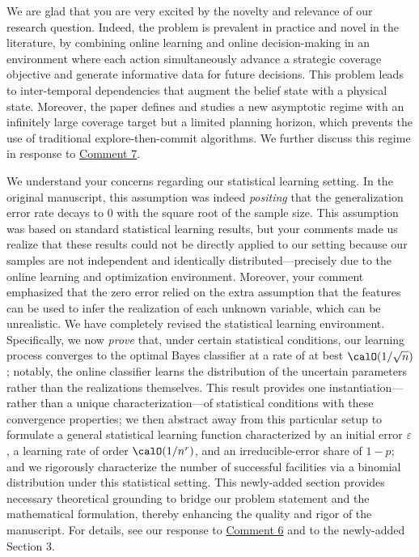 \documentclass[11pt]{article}
\begin{document}
We are glad that you are very excited by the novelty and relevance of our research question. Indeed, the problem is prevalent in practice and novel in the literature, by combining online learning and online decision-making in an environment where each action simultaneously advance a strategic coverage objective and generate informative data for future decisions. This problem leads to inter-temporal dependencies that augment the belief state with a physical state. Moreover, the paper defines and studies a new asymptotic regime with an infinitely large coverage target but a limited planning horizon, which prevents the use of traditional explore-then-commit algorithms. We further discuss this regime in response to \hyperref[R1:7]{\color{blue}Comment 7}.

We understand your concerns regarding our statistical learning setting. In the original manuscript, this assumption was indeed \textit{positing} that the generalization error rate decays to 0 with the square root of the sample size. This assumption was based on standard statistical learning results, but your comments made us realize that these results could not be directly applied to our setting because our samples are not independent and identically distributed---precisely due to the online learning and optimization environment. Moreover, your comment emphasized that the zero error relied on the extra assumption that the features can be used to infer the realization of each unknown variable, which can be unrealistic. We have completely revised the statistical learning environment. Specifically, we now \textit{prove} that, under certain statistical conditions, our learning process converges to the optimal Bayes classifier at a rate of at best $\calO(1/\sqrt{n})$; notably, the online classifier learns the distribution of the uncertain parameters rather than the realizations themselves. This result provides one instantiation—rather than a unique characterization—of statistical conditions with these convergence properties; we then abstract away from this particular setup to formulate a general statistical learning function characterized by an initial error $\varepsilon$, a learning rate of order $\calO(1/n^{r})$, and an irreducible-error share of $1-p$; and we rigorously characterize the number of successful facilities via a binomial distribution under this statistical setting. This newly-added section provides necessary theoretical grounding to bridge our problem statement and the mathematical formulation, thereby enhancing the quality and rigor of the manuscript. For details, see our response to \hyperref[R1:6]{\color{blue}Comment 6} and to the newly-added Section 3.
\end{document}
